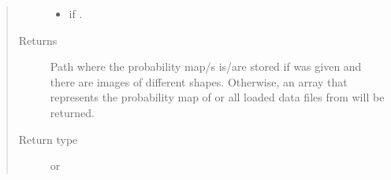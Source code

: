 \documentclass[letterpaper,10pt,english]{sphinxmanual}
\begin{document}
\begin{fulllineitems}
\begin{quote}
\begin{description}
\begin{itemize}
\item {} 
 \textendash{} if .

\end{itemize}

\item[{Returns}] \leavevmode
{} \textendash{} Path where the probability map/s is/are stored if  was given and there are images of different
shapes. Otherwise, an array that represents the probability map of  or all loaded data files from
 will be returned.

\item[{Return type}] \leavevmode
{} or 

\end{description}\end{quote}

\end{fulllineitems}

\end{document}
